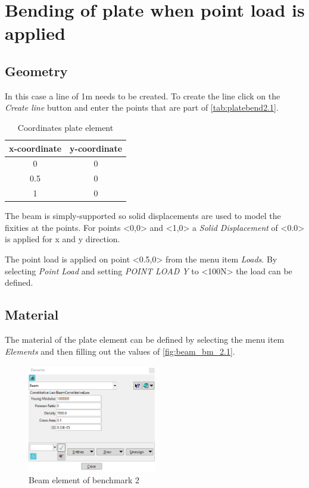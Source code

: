 \documentclass{deltares_manual_style}
\begin{document}
\section{Bending of plate when point load is applied}
\subsection{Geometry}
In this case a line of 1m needs to be created. To create the line click on the \textit{Create line} button and enter the 
points that are part of \autoref{tab:platebend2.1}.
\begin{table}[h]
	\caption{Coordinates plate element}
	\label{tab:platebend2.1}
	\centering
		\begin{tabular}{|c|c|}
			\hline
			x-coordinate & y-coordinate \\ \hline
			0 & 0 \\ \hline
			0.5 & 0 \\ \hline
			1 & 0 \\ \hline
		\end{tabular}
\end{table}

The beam is simply-supported so solid displacements are used to model the fixities at the points. For points <0,0> and 
<1,0> a \textit{Solid Displacement} of <0.0> is applied for x and y direction. 

The point load is applied on point <0.5,0> from the menu item \textit{Loads}. By selecting \textit{Point Load} and 
setting \textit{POINT LOAD Y} to <100N> the load can be defined.  
 
\subsection{Material}
The material of the plate element can be defined by selecting the menu item \textit{Elements} and then filling out the 
values of \autoref{fig:beam_bm_2.1}.

\begin{figure}[h]
	\centering
		\includegraphics[width=0.50\textwidth]{figures/beam_bm_2_1.png}
	\caption{Beam element of benchmark 2}
	\label{fig:beam_bm_2.1}
\end{figure}
\end{document}
